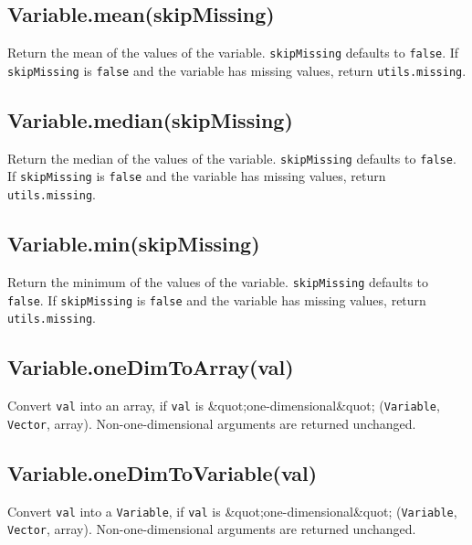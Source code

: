 \documentclass{article}
\begin{document}
    \subsection*{Variable.mean(skipMissing)}
    Return the mean of the values of the variable.
\texttt{skipMissing} defaults to \texttt{false}.  If \texttt{skipMissing} is \texttt{false} and
the variable has missing values, return \texttt{utils.missing}.


    \subsection*{Variable.median(skipMissing)}
    Return the median of the values of the variable.
\texttt{skipMissing} defaults to \texttt{false}.  If \texttt{skipMissing} is \texttt{false} and
the variable has missing values, return \texttt{utils.missing}.


    \subsection*{Variable.min(skipMissing)}
    Return the minimum of the values of the variable.
\texttt{skipMissing} defaults to \texttt{false}.  If \texttt{skipMissing} is \texttt{false} and
the variable has missing values, return \texttt{utils.missing}.


    \subsection*{Variable.oneDimToArray(val)}
    Convert \texttt{val} into an array, if \texttt{val} is \&quot;one-dimensional\&quot;
(\texttt{Variable}, \texttt{Vector}, array).
Non-one-dimensional arguments are returned unchanged.


    \subsection*{Variable.oneDimToVariable(val)}
    Convert \texttt{val} into a \texttt{Variable}, if \texttt{val} is \&quot;one-dimensional\&quot;
(\texttt{Variable}, \texttt{Vector}, array).
Non-one-dimensional arguments are returned unchanged.
\end{document}
